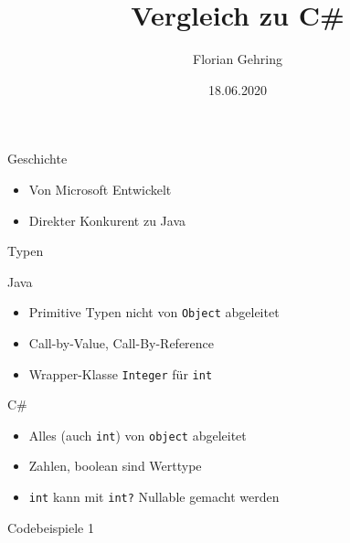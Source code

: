 \documentclass[11pt]{beamer}
\author{Florian Gehring}
\title{Vergleich zu C\#}
\date{18.06.2020}
\begin{document}
\setlength{\columnseprule}{0.4pt}

\begin{frame}
\titlepage
\end{frame}


\begin{frame}{Geschichte}
\begin{itemize}
	\item Von Microsoft Entwickelt
	\item \glqq Direkter Konkurent\grqq{} zu Java
\end{itemize}
\end{frame}

\begin{frame}{Typen}
\begin{multicols}{2}
Java \\
\begin{itemize}
\item Primitive Typen nicht von \texttt{Object} abgeleitet
\item Call-by-Value, Call-By-Reference
\item Wrapper-Klasse \texttt{Integer} für \texttt{int}
\end{itemize}

\columnbreak


C\#\\
\begin{itemize}
\item Alles (auch \texttt{int}) von \texttt{object} abgeleitet
\item Zahlen, boolean sind \glqq{}Werttype\grqq{}
\item \texttt{int} kann mit \texttt{int?} Nullable gemacht werden
\end{itemize}
\end{multicols}
\end{frame}

\begin{frame}{Codebeispiele 1}


\end{frame}
\end{document}
